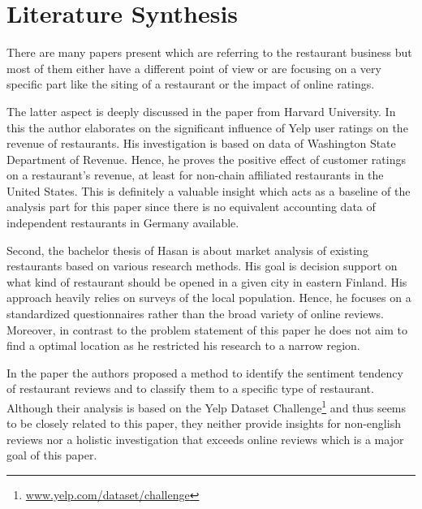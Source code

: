 \section{Literature Synthesis}
\label{sec:synthesis}
There are many papers present which are referring to the restaurant business but most of them either have a different point of view or are focusing on a very specific part like the siting of a restaurant or the impact of online ratings.

The latter aspect is deeply discussed in the paper from Harvard University\cite{CaseOfYelp}. In this the author elaborates on the significant influence of Yelp user ratings on the revenue of restaurants. His investigation is based on data of Washington State Department of Revenue. Hence, he proves the positive effect of customer ratings on a restaurant's revenue, at least for non-chain affiliated restaurants in the United States. This is definitely a valuable insight which acts as a baseline of the analysis part for this paper since there is no equivalent accounting data of independent restaurants in Germany available. 

Second, the bachelor thesis of Hasan\cite{Imatra} is about market analysis of existing restaurants based on various research methods. His goal is decision support on what kind of restaurant should be opened in a given city in eastern Finland. His approach heavily relies on surveys of the local population. Hence, he focuses on a standardized questionnaires rather than the broad variety of online reviews. Moreover, in contrast to the problem statement of this paper he does not aim to find a optimal location as he restricted his research to a narrow region. 

In the paper \cite{SentimentAnalysis} the authors proposed a method to identify the sentiment tendency of restaurant reviews and to classify them to a specific type of restaurant. Although their analysis is based on the Yelp Dataset Challenge\footnote{\href{https://www.yelp.com/dataset/challenge}{www.yelp.com/dataset/challenge}} and thus seems to be closely related to this paper, they neither provide insights for non-english reviews nor a holistic investigation that exceeds online reviews which is a major goal of this paper.
